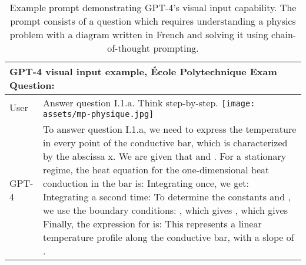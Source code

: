 \documentclass{article}
\begin{document}
\begin{table}
\begin{tabular}[]{p{0.5in}p{4.5in}}
\toprule
\multicolumn{2}{p{5in}}{
\textbf{GPT-4 visual input example, École Polytechnique Exam Question}:}\\
\midrule
User & Answer question I.1.a. Think step-by-step.\newline\newline
\texttt{[image: assets/mp-physique.jpg]}\newline
\\
GPT-4 & To answer question I.1.a, we need to express the temperature  in every point of the conductive bar, which is characterized by the abscissa x. We are given that  and .\newline
\newline
For a stationary regime, the heat equation for the one-dimensional heat conduction in the bar is:\newline
\newline
\newline
Integrating once, we get:\newline
\newline
\newline
Integrating a second time:\newline
\newline
\newline
To determine the constants  and , we use the boundary conditions:\newline
, which gives \newline
, which gives \newline
\newline
Finally, the expression for  is:\newline
\newline
This represents a linear temperature profile along the conductive bar, with a slope of .\\
\bottomrule
\end{tabular}
\caption{Example prompt demonstrating GPT-4's visual input capability. The prompt consists of a question which requires understanding a physics problem with a diagram written in French and solving it using chain-of-thought prompting.}
\label{table:visual_input_ecole}
\end{table}
\end{document}
